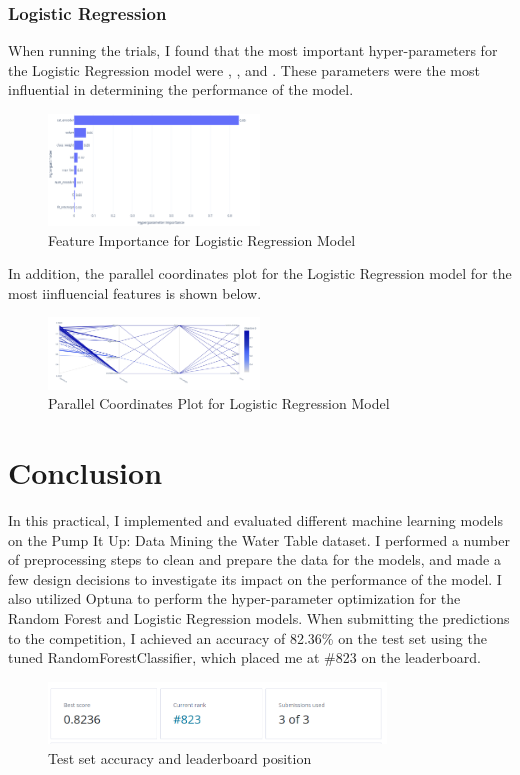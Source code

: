 \documentclass{article}
\begin{document}
\subsubsection{Logistic Regression}
When running the trials, I found that the most important hyper-parameters for the Logistic Regression model were , , and . These parameters were the most influential in determining the performance of the model.

\begin{figure}[H]
  \centering
  \includegraphics[width=0.5\textwidth]{img/lr_importance.png}
  \caption{Feature Importance for Logistic Regression Model}
\end{figure}

\noindent In addition, the parallel coordinates plot for the Logistic Regression model for the most iinfluencial features is shown below.

\begin{figure}[H]
  \centering
  \includegraphics[width=0.5\textwidth]{img/tmp2.png}
  \caption{Parallel Coordinates Plot for Logistic Regression Model}
\end{figure}

\section{Conclusion}
In this practical, I implemented and evaluated different machine learning models on the Pump It Up: Data Mining the Water Table dataset. I performed a number of preprocessing steps to clean and prepare the data for the models, and made a few design decisions to investigate its impact on the performance of the model. I also utilized Optuna to perform the hyper-parameter optimization for the Random Forest and Logistic Regression models. When submitting the predictions to the competition, I achieved an accuracy of 82.36\% on the test set using the tuned RandomForestClassifier, which placed me at \#823 on the leaderboard.

\begin{figure}[H]
  \centering
  \includegraphics[width=0.8\textwidth]{img/leaderboard.png}
  \caption{Test set accuracy and leaderboard position}
\end{figure}

\printbibliography
\end{document}
